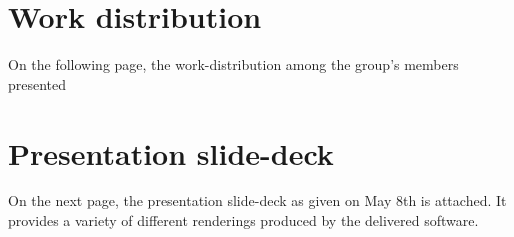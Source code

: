 \appendix
\newpage
\section{Work distribution}
On the following page, the work-distribution among the group's members presented



\section{Presentation slide-deck \label{sec:SlideDeck}}
On the next page, the presentation slide-deck as given on May 8th is attached. It provides a variety of different renderings produced by the delivered software. 
